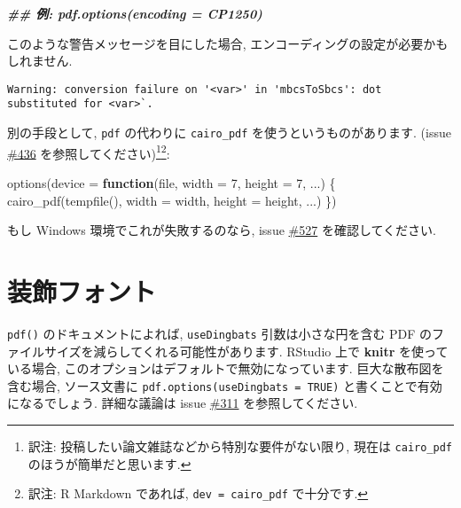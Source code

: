 \documentclass[
  xelatex,ja=standard,jafont=noto]{bxjsreport}
\newenvironment{Shaded}{\begin{snugshade}}{\end{snugshade}}
\newcommand{\AttributeTok}[1]{\textcolor[rgb]{0.77,0.63,0.00}{#1}}
\newcommand{\ControlFlowTok}[1]{\textcolor[rgb]{0.13,0.29,0.53}{\textbf{#1}}}
\newcommand{\DecValTok}[1]{\textcolor[rgb]{0.00,0.00,0.81}{#1}}
\newcommand{\DocumentationTok}[1]{\textcolor[rgb]{0.56,0.35,0.01}{\textbf{\textit{#1}}}}
\newcommand{\FunctionTok}[1]{\textcolor[rgb]{0.00,0.00,0.00}{#1}}
\newcommand{\NormalTok}[1]{#1}
\begin{document}
\begin{Shaded}
\begin{Highlighting}[numbers=left,,]
\DocumentationTok{\#\# 例: pdf.options(encoding = \textquotesingle{}CP1250\textquotesingle{})}
\end{Highlighting}
\end{Shaded}

このような警告メッセージを目にした場合,
エンコーディングの設定が必要かもしれません.

\begin{verbatim}
Warning: conversion failure on '<var>' in 'mbcsToSbcs': dot substituted for <var>`.
\end{verbatim}

別の手段として, \texttt{pdf} の代わりに \texttt{cairo\_pdf}
を使うというものがあります. (issue
\href{https://github.com/yihui/knitr/issues/436}{\#436}
を参照してください)\footnote{訳注:
  投稿したい論文雑誌などから特別な要件がない限り, 現在は
  \texttt{cairo\_pdf} のほうが簡単だと思います.}\footnote{訳注: R
  Markdown であれば,
  \texttt{dev\ =\ \textquotesingle{}cairo\_pdf\textquotesingle{}}
  で十分です.}:

\begin{Shaded}
\begin{Highlighting}[numbers=left,,]
\FunctionTok{options}\NormalTok{(}\AttributeTok{device =} \ControlFlowTok{function}\NormalTok{(file, }\AttributeTok{width =} \DecValTok{7}\NormalTok{, }\AttributeTok{height =} \DecValTok{7}\NormalTok{, ...) \{}
  \FunctionTok{cairo\_pdf}\NormalTok{(}\FunctionTok{tempfile}\NormalTok{(), }\AttributeTok{width =}\NormalTok{ width, }\AttributeTok{height =}\NormalTok{ height, ...)}
\NormalTok{\})}
\end{Highlighting}
\end{Shaded}

もし Windows 環境でこれが失敗するのなら, issue
\href{https://github.com/yihui/knitr/issues/527}{\#527}
を確認してください.

\hypertarget{ux88c5ux98feux30d5ux30a9ux30f3ux30c8}{%
\section*{装飾フォント}\label{ux88c5ux98feux30d5ux30a9ux30f3ux30c8}}

\texttt{pdf()} のドキュメントによれば, \texttt{useDingbats}
引数は小さな円を含む PDF
のファイルサイズを減らしてくれる可能性があります. RStudio 上で
\textbf{knitr} を使っている場合,
このオプションはデフォルトで無効になっています. 巨大な散布図を含む場合,
ソース文書に \texttt{pdf.options(useDingbats\ =\ TRUE)}
と書くことで有効になるでしょう. 詳細な議論は issue
\href{https://github.com/yihui/knitr/issues/311}{\#311}
を参照してください.
\end{document}
